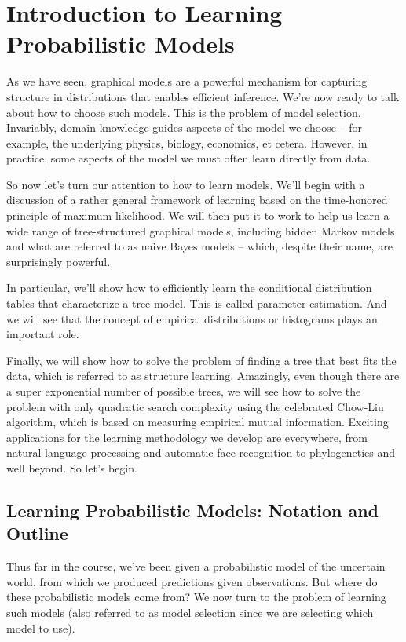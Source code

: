 \documentclass[6008notes.tex]{subfiles}
\begin{document}
\graphicspath{ {images/intropl/} }

\section{Introduction to Learning Probabilistic Models}

As we have seen, graphical models are a powerful mechanism for capturing structure in distributions that enables efficient inference. We're now ready to talk about how to choose such models. This is the problem of model selection. Invariably, domain knowledge guides aspects of the model we choose -- for example, the underlying physics, biology, economics, et cetera. However, in practice, some aspects of the model we must often learn directly from data.

So now let's turn our attention to how to learn models. We'll begin with a discussion of a rather general framework of learning based on the time-honored principle of maximum likelihood. We will then put it to work to help us learn a wide range of tree-structured graphical models, including hidden Markov models and what are referred to as naive Bayes models -- which, despite their name, are surprisingly powerful.

In particular, we'll show how to efficiently learn the conditional distribution tables that characterize a tree model. This is called parameter estimation. And we will see that the concept of empirical distributions or histograms plays an important role.

Finally, we will show how to solve the problem of finding a tree that best fits the data, which is referred to as structure learning. Amazingly, even though there are a super exponential number of possible trees, we will see how to solve the problem with only quadratic search complexity using the celebrated Chow-Liu algorithm, which is based on measuring empirical mutual information. Exciting applications for the learning methodology we develop are everywhere, from natural language processing and automatic face recognition to phylogenetics and well beyond. So let's begin.

\subsection{Learning Probabilistic Models: Notation and Outline}

Thus far in the course, we've been given a probabilistic model of the uncertain world, from which we produced predictions given observations. But where do these probabilistic models come from? We now turn to the problem of learning such models (also referred to as model selection since we are selecting which model to use).
\end{document}
